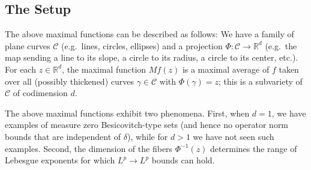 \documentclass[letterpaper, reqno,11pt]{article}
\numberwithin{equation}{section}
\newcommand{\RR}{\mathbb{R}}
\numberwithin{thm}{section}
\theoremstyle{remark}
\begin{document}
\subsection{The Setup}\label{setupSection}
The above maximal functions can be described as follows: We have a family of plane curves $\mathcal{C}$ (e.g.~lines, circles, ellipses) and a projection $\Phi\colon\mathcal{C}\to\RR^d$ (e.g.~the map sending a line to its slope, a circle to its radius, a circle to its center, etc.). For each $z\in\RR^d$, the maximal function $Mf(z)$ is a maximal average of $f$ taken over all (possibly thickened) curves $\gamma\in \mathcal{C}$ with $\Phi(\gamma)=z$; this is a subvariety of $\mathcal{C}$ of codimension $d$. 

The above maximal functions exhibit two phenomena. First, when $d=1$, we have examples of measure zero Besicovitch-type sets (and hence no operator norm bounds that are independent of $\delta$), while for $d>1$ we have not seen such examples. Second, the dimension of the fibers $\Phi^{-1}(z)$ determines the range of Lebesgue exponents for which $L^p\to L^p$ bounds can hold. 
\end{document}
